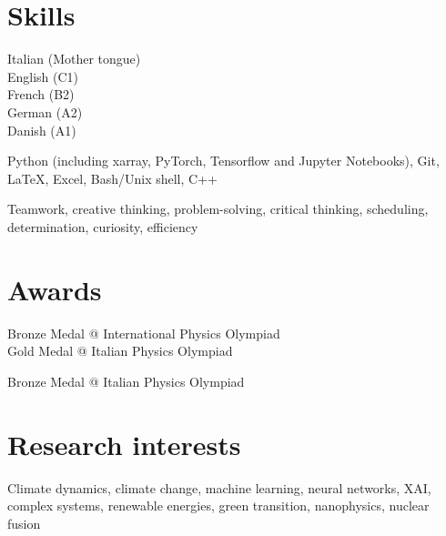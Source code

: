\documentclass[11pt, a4 paper]{article}
\begin{document}


\section*{Skills}
  \begin{description}[style=multiline,leftmargin=3cm,align=right]
    \item[Languages]
      Italian (Mother tongue) \\
      English (C1) \\
      French (B2) \\
      German (A2) \\
      Danish (A1)
    \item[Software]
      Python (including xarray, PyTorch, Tensorflow and Jupyter Notebooks), Git, LaTeX, Excel, Bash/Unix shell, C++
    \item[Transversal]
      Teamwork, creative thinking, problem-solving, critical thinking, scheduling, determination, curiosity, efficiency
  \end{description}


\section*{Awards}
  \begin{description}[style=multiline,leftmargin=3cm,align=right]
    \item[2016]
      Bronze Medal @ International Physics Olympiad \\
      Gold Medal @ Italian Physics Olympiad
    \item[2015] Bronze Medal @ Italian Physics Olympiad
  \end{description}


\section*{Research interests}
  \begin{description}[style=multiline,leftmargin=3cm,align=right]
    \item[] Climate dynamics, climate change, machine learning, neural networks, XAI, complex systems, renewable energies, green transition, nanophysics, nuclear fusion
  \end{description}
\end{document}
